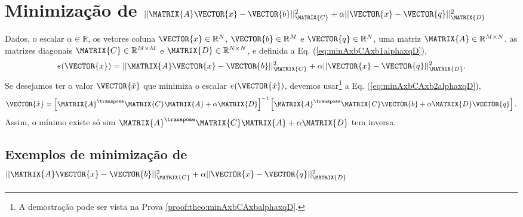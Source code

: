 \section{Minimização de $||\MATRIX{A}\VECTOR{x}-\VECTOR{b}||_{\MATRIX{C}}^2+\alpha ||\VECTOR{x}-\VECTOR{q}||_{\MATRIX{D}}^2$}
\label{sec:minAxbCAxbplusalphaxqD}


\begin{theorem}\label{theo:minAxbCAxbplusalphaxqD}
Dados,
o escalar $\alpha \in \mathbb{R}$, 
os vetores coluna $\VECTOR{x}\in \mathbb{R}^N$, 
$\VECTOR{b}\in \mathbb{R}^M$ e
$\VECTOR{q}\in \mathbb{R}^N$,  
uma matriz $\MATRIX{A} \in \mathbb{R}^{M\times N}$, 
as matrizes diagonais $\MATRIX{C} \in \mathbb{R}^{M\times M}$ e
$\MATRIX{D} \in \mathbb{R}^{N\times N}$, e 
definida a Eq. (\ref{eq:minAxbCAxb1alphaxqD}),
\begin{equation}\label{eq:minAxbCAxb1alphaxqD}
e(\VECTOR{x})  = ||\MATRIX{A}\VECTOR{x}-\VECTOR{b}||_{\MATRIX{C}}^2 +\alpha ||\VECTOR{x}-\VECTOR{q}||_{\MATRIX{D}}^2.
\end{equation}
Se desejamos ter o valor $\VECTOR{\hat{x}}$ que minimiza o escalar $e(\VECTOR{\hat{x}})$,
devemos usar\footnote{A demostração pode ser vista na Prova \ref{proof:theo:minAxbCAxbalphaxqD}.} a Eq. (\ref{eq:minAxbCAxb2alphaxqD}),
\begin{equation}\label{eq:minAxbCAxb2alphaxqD}
\VECTOR{\hat{x}}=\left[ \MATRIX{A}^{\transpose}\MATRIX{C}\MATRIX{A} +\alpha\MATRIX{D}\right]^{-1} 
\left[ \MATRIX{A}^{\transpose}\MATRIX{C} \VECTOR{b}+\alpha\MATRIX{D}\VECTOR{q}\right].
\end{equation}
Assim, o mínimo existe só sim $\MATRIX{A}^{\transpose}\MATRIX{C}\MATRIX{A} +\alpha\MATRIX{D}$ tem inversa.
\end{theorem}



\subsection{Exemplos de minimização de 
$||\MATRIX{A}\VECTOR{x}-\VECTOR{b}||_{\MATRIX{C}}^2+\alpha ||\VECTOR{x}-\VECTOR{q}||_{\MATRIX{D}}^2$}

